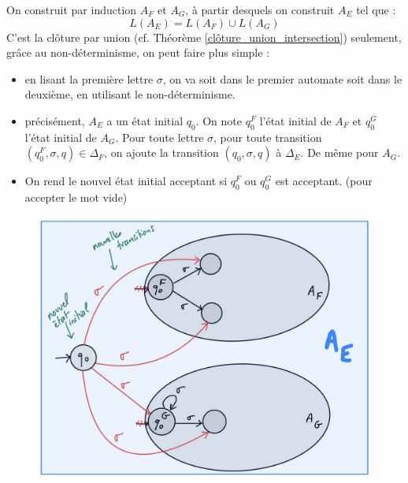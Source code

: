 On construit par induction $A_F$ et $A_G$, à partir desquels on construit $A_E$ tel que :
\begin{equation*}
    L(A_E) = L(A_F) \cup L(A_G)
\end{equation*}
C'est la clôture par union (cf. Théorème \ref{clôture_union_intersection}) seulement, grâce au non-déterminisme, on peut 
faire plus simple :
\begin{itemize}[label=\textbullet]
    \item en lisant la première lettre $\sigma$, on va soit dans le premier automate soit dans le deuxième, en utilisant le
    non-déterminisme.
    \item précisément, $A_E$ a un état initial $q_0$. On note $q_0^F$ l'état initial de $A_F$ et $q_0^G$ l'état initial de
    $A_G$. Pour toute lettre $\sigma$, pour toute transition $(q_0^F,\sigma,q)\in\Delta_F$, on ajoute la transition $(q_0,
    \sigma, q)$ à $\Delta_E$. De même pour $A_G$.
    \item On rend le nouvel état initial acceptant si $q_0^F$ ou $q_0^G$ est acceptant. (pour accepter le mot vide)
\end{itemize}
\begin{figure}[H]
    \centering
    \includegraphics[scale = 0.4]{pictures/EF+G.png}
\end{figure}


